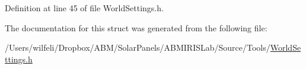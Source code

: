 Definition at line 45 of file World\+Settings.\+h.



The documentation for this struct was generated from the following file\+:\begin{DoxyCompactItemize}
\item 
/\+Users/wilfeli/\+Dropbox/\+A\+B\+M/\+Solar\+Panels/\+A\+B\+M\+I\+R\+I\+S\+Lab/\+Source/\+Tools/\hyperlink{_world_settings_8h}{World\+Settings.\+h}\end{DoxyCompactItemize}
